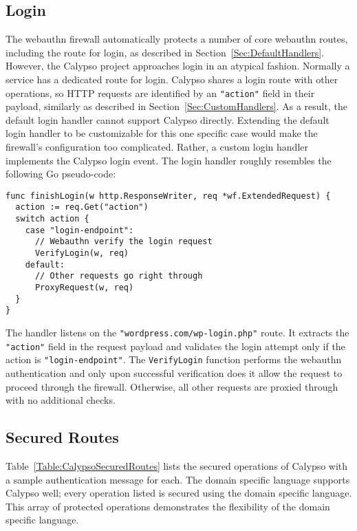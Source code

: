\subsection{Login}\label{Sec:CalypsoLogin}

The webauthn firewall automatically protects a number of core webauthn routes, including the route for login, as described in Section~\ref{Sec:DefaultHandlers}. However, the Calypso project approaches login in an atypical fashion. Normally a service has a dedicated route for login. Calypso shares a login route with other operations, so HTTP requests are identified by an \lstinline{"action"} field in their payload, similarly as described in Section~\ref{Sec:CustomHandlers}. As a result, the default login handler cannot support Calypso directly. Extending the default login handler to be customizable for this one specific case would make the firewall's configuration too complicated. Rather, a custom login handler implements the Calypso login event. The login handler roughly resembles the following Go pseudo-code:

\begin{lstlisting}[float=h]
func finishLogin(w http.ResponseWriter, req *wf.ExtendedRequest) {
  action := req.Get("action")
  switch action {
    case "login-endpoint":
      // Webauthn verify the login request
      VerifyLogin(w, req)
    default:
      // Other requests go right through
      ProxyRequest(w, req)
  }
}
\end{lstlisting}

The handler listens on the \lstinline{"wordpress.com/wp-login.php"} route. It extracts the \lstinline{"action"} field in the request payload and validates the login attempt only if the action is \lstinline{"login-endpoint"}. The \lstinline{VerifyLogin} function performs the webauthn authentication and only upon successful verification does it allow the request to proceed through the firewall. Otherwise, all other requests are proxied through with no additional checks.

\subsection{Secured Routes}\label{Sec:CalypsoSecuredRoutes}

Table~\ref{Table:CalypsoSecuredRoutes} lists the secured operations of Calypso with a sample authentication message for each. The domain specific language supports Calypso well; every operation listed is secured using the domain specific language. This array of protected operations demonstrates the flexibility of the domain specific language.

